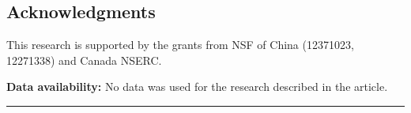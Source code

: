 \documentclass{book}
\theoremstyle{remark}
\begin{document}
\begin{multicols}{2}
\section{Acknowledgments}
This research is supported by the grants from NSF of China (12371023, 12271338) and Canada NSERC.

{\bf Data availability:} No data was used for the research described in the article.

\parskip=5pt
\noindent \rule[0pt]{25em}{1pt}

\parskip=10pt
\vspace{-6pt}




\end{multicols}
\end{document}
